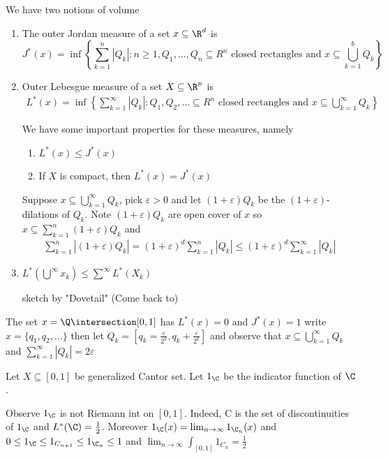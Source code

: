 We have two notions of volume
\begin{enumerate}
	\item The outer Jordan measure of a set $x \subseteq \R^d$ is
			\[
				J^* (x)
				= \inf \left\{ \sum_{k=1}^{n} |Q_k| : n \geq 1, Q_1, \ldots, Q_n \subseteq R^n
					\text{ closed rectangles and }
				x \subseteq \bigcup_{k=1}^{b} Q_k \right\}
			\]
	\item Outer Lebesgue measure of a set $X \subseteq \R^n$ is
		\begin{align*}
			L^*(x) = \inf \left\{ \sum_{k=1}^{\infty}|Q_k| : Q_1, Q_2, \ldots \subseteq R^n
				\text{ closed rectangles and } x \subseteq \bigcup_{k=1}^{\infty} Q_k \right\}
		\end{align*}

		We have some important properties for these measures, namely

		\begin{enumerate}
			\item $L^*(x) \leq J^* (x)$
			\item If  $X$ is compact, then $L^*(x) = J^*(x)$
		\end{enumerate}
		\begin{solution}
			Suppose $x \subseteq \bigcup_{k=1}^{\infty} Q_k$, pick $\varepsilon > 0$ and let  $(1 + \varepsilon)Q_k$ be the $(1 + \varepsilon)$-dilations of $Q_k$. Note $(1+ \varepsilon ) Q_k$ are open cover of  $x$ so $x \subseteq \sum_{k=1}^n (1+\varepsilon) Q_k$ and
			\begin{align*}
				\sum_{k=1}^{n} |(1 + \varepsilon) Q_k| = (1+\varepsilon)^d \sum_{k=1}^{n}|Q_k| \leq (1 + \varepsilon)^d \sum_{k=1}^{\infty} | Q_k|
			\end{align*}
		\end{solution}

	\item $L^* (\bigcup^{\infty} x_k ) \leq \sum_{}^{\infty} L^* (X_{k})$

		\begin{solution}
			sketch by "Dovetail" (Come back to)
		\end{solution}
\end{enumerate}

\begin{example}
	The set $x = \Q \intersection [0,1]$ has  $L^*(x) = 0$ and  $J^*(x) = 1$ write  $x = \{q_1, q_2, \ldots \}$ then let $Q_k = [q_k =  \frac{\varepsilon}{2^k}, q_k + \frac{\varepsilon}{2^k}]$
	and observe that $x \subseteq \bigcup_{k = 1}^{\infty} Q_k$ and $\sum_{k=1}^{\infty} |Q_k| = 2 \varepsilon$
\end{example}

\begin{example}
	Let $X \subseteq [0,1]$ be generalized Cantor set. Let $1_{\C}$ be the indicator function of $\C$.

	Observe $1_ {\C}$ is not Riemann int on $[0,1]$. Indeed, C is the set of discontinuities of $1_{\C}$ and $L^*(\C) = \frac{1}{2}$. Moreover $1_{\C}(x) = \lim_{n\to \infty} 1_{\C_n} (x)$ and
	$0 \leq 1_{\C} \leq 1_{C_{n+1}} \leq 1_{\C_{n}} \leq 1$ and
	$\lim_{n \to \infty} \int_{[0,1]} 1_{C_{n}} = \frac{1}{2} $
\end{example}
